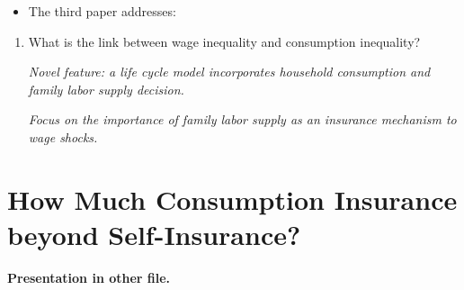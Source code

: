 \documentclass[notes=show]{beamer}
\begin{document}
\begin{frame}%



\begin{itemize}
\item The third paper addresses:
\end{itemize}

\begin{enumerate}
\item What is the link between wage inequality and consumption inequality?

\textit{Novel feature: a life cycle model incorporates household consumption
and family labor supply decision.}

\textit{Focus on the importance of family labor supply as an insurance
mechanism to wage shocks.}
\end{enumerate}

\transboxout%
\end{frame}%

\bigskip

\section{How Much Consumption Insurance beyond Self-Insurance?}

\begin{frame}%


\textbf{Presentation in other file.}

\transboxout%
\end{frame}%
\end{document}
